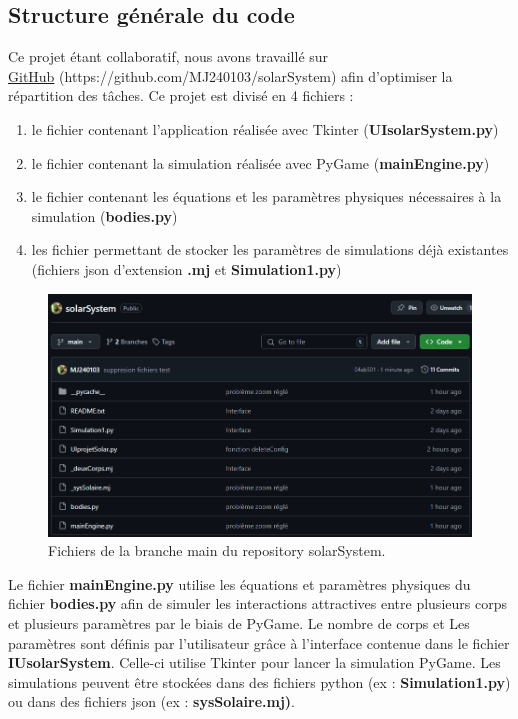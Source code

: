 \documentclass[a4paper, 12pt]{article}
\begin{document}
\subsection{Structure générale du code}
	Ce projet étant collaboratif, nous avons travaillé sur\\ \href{https://github.com/MJ240103/solarSystem}{GitHub} (https://github.com/MJ240103/solarSystem) afin d'optimiser la répartition des tâches. Ce projet est divisé en 4 fichiers : \\
    \begin{enumerate}
        \item le fichier contenant l'application réalisée avec Tkinter (\textbf{UIsolarSystem.py})
        \item le fichier contenant la simulation réalisée avec PyGame (\textbf{mainEngine.py})
        \item le fichier contenant les équations et les paramètres physiques nécessaires à la simulation (\textbf{bodies.py})
        \item les fichier permettant de stocker les paramètres de simulations déjà existantes (fichiers json d'extension \textbf{.mj} et \textbf{Simulation1.py})
    \end{enumerate}
    \begin{figure}[H]
        \centering
        \includegraphics[width=0.45\linewidth]{imgGitHub.png}
        \caption{\label{fig:Git}Fichiers de la branche main du repository solarSystem.}
    \end{figure} 
     
	Le fichier \textbf{mainEngine.py} utilise les équations et paramètres physiques du fichier \textbf{bodies.py} afin de simuler les interactions attractives entre plusieurs corps et plusieurs paramètres par le biais de PyGame. Le nombre de corps et Les paramètres sont définis par l'utilisateur grâce à l'interface contenue dans le fichier \textbf{IUsolarSystem}. Celle-ci utilise Tkinter pour lancer la simulation PyGame. Les simulations peuvent être stockées dans des fichiers python (ex : \textbf{Simulation1.py}) ou dans des fichiers json (ex : \textbf{sysSolaire.mj)}.
%
%
%
\newpage
\end{document}
